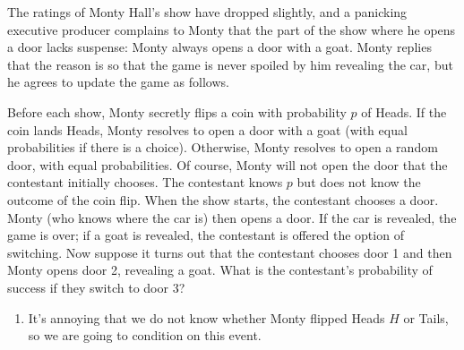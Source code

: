 

\setcounter{theorem}{18}
\begin{exercise}[BH.2.19]
  The ratings of Monty Hall's show have dropped slightly, and a panicking executive producer complains to Monty that the part of the show where he opens a door lacks suspense: Monty always opens a door with a goat. Monty replies that the reason is so that the game is never spoiled by him revealing the car, but he agrees to update the game as follows.
	
	Before each show, Monty secretly flips a coin with probability $p$ of Heads. If the coin lands Heads, Monty resolves to open a door with a goat (with equal probabilities if there is a choice). Otherwise, Monty resolves to open a random door, with equal probabilities. Of course, Monty will not open the door that the contestant initially chooses. The contestant knows $p$ but does not know the outcome of the coin flip. When the show starts, the contestant chooses a door. Monty (who knows where the car is) then opens a door. If the car is revealed, the game is over; if a goat is revealed, the contestant is offered the option of switching. Now suppose it turns out that the contestant chooses door 1 and then Monty opens door 2, revealing a goat. What is the contestant's probability of success if they switch to door 3?
\begin{solution}
	\begin{enumerate}
		\item It's annoying that we do not know whether Monty flipped Heads $H$ or Tails, so we are going to condition on this event.  
	

\end{enumerate}
\end{solution}
\end{exercise}
